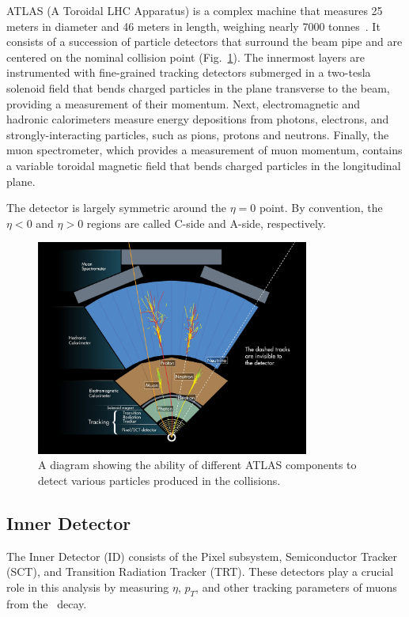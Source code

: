 ATLAS (A Toroidal LHC Apparatus) is a complex machine that measures 25 meters in diameter and 46 meters in length, weighing nearly 7000 tonnes~\cite{Aad:2009wy}. It consists of a succession of particle detectors that surround the beam pipe and are centered on the nominal collision point (Fig.~\ref{fig:det:passage}). The innermost layers are instrumented with fine-grained tracking detectors submerged in a two-tesla solenoid field that bends charged particles in the plane transverse to the beam, providing a measurement of their momentum. Next, electromagnetic and hadronic calorimeters measure energy depositions from photons, electrons, and strongly-interacting particles, such as pions, protons and neutrons. Finally, the muon spectrometer, which provides a measurement of muon momentum, contains a variable toroidal magnetic field that bends charged particles in the longitudinal plane.

The detector is largely symmetric around the $\eta=0$ point. By convention, the $\eta<0$ and $\eta>0$ regions are called C-side and A-side, respectively.

\begin{figure}[phtb]
  \begin{center}
    \includegraphics[width=0.80\textwidth]{det/fig/detection}
    \caption{ A diagram showing the ability of different ATLAS components to detect various particles produced in the collisions. }
    \label{fig:det:passage}
  \end{center}
\end{figure}

\subsection{ Inner Detector }
\label{chap:det:id}
The Inner Detector (ID) consists of the Pixel subsystem, Semiconductor Tracker (SCT), and Transition Radiation Tracker (TRT). These detectors play a crucial role in this analysis by measuring $\eta$, $p_{T}$, and other tracking parameters of muons from the \Wmn\ decay.

